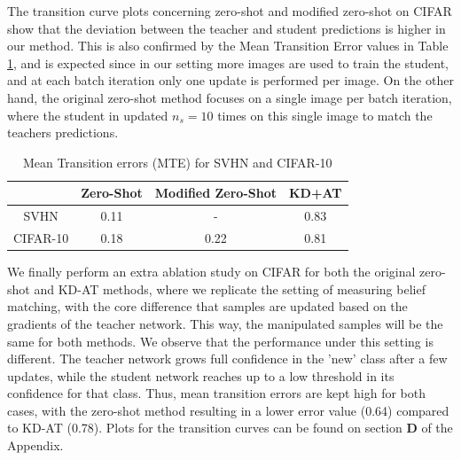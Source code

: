 The transition curve plots concerning zero-shot and modified zero-shot on CIFAR show that the deviation between the teacher and student predictions is higher in our method. This is also confirmed by the Mean Transition Error values in Table \ref{mtetab}, and is expected since in our setting more images are used to train the student, and at each batch iteration only one update is performed per image. On the other hand, the original zero-shot method focuses on a single image per batch iteration, where the student in updated $n_s=10$ times on this single image to match the teachers predictions.  

\begin{table}[!h]
    \centering
    \begin{tabular}{cccc}
    \toprule
    \toprule
         \textbf{} & \textbf{Zero-Shot} & \textbf{Modified Zero-Shot}  & \textbf{KD+AT}\\
         \midrule
         SVHN & 0.11 & - & 0.83\\
         CIFAR-10 & 0.18 & 0.22 & 0.81\\
         \bottomrule 
         \bottomrule
    \end{tabular}
    \vspace{0.25cm}
    \caption{Mean Transition errors (MTE) for SVHN and CIFAR-10}
    \label{mtetab}
    \vspace{-0.2cm}

\end{table}

We finally perform an extra ablation study on CIFAR for both the original zero-shot and KD-AT methods, where we replicate the setting of measuring belief matching, with the core difference that samples are updated based on the gradients of the teacher network. This way, the manipulated samples will be the same for both methods. We observe that the performance under this setting is different. The teacher network grows full confidence in the 'new' class after a few updates, while the student network reaches up to a low threshold in its confidence for that class. Thus, mean transition errors are kept high for both cases, with the zero-shot method resulting in a lower error value (0.64) compared to KD-AT (0.78). Plots for the transition curves can be found on section \textbf{D} of the Appendix. 